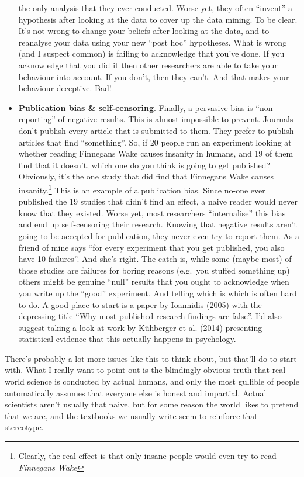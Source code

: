 \documentclass[
  letterpaper,
]{book}
\begin{document}
\begin{itemize}
  the only analysis that they ever conducted. Worse yet, they often
  ``invent'' a hypothesis after looking at the data to cover up the data
  mining. To be clear. It's not wrong to change your beliefs after
  looking at the data, and to reanalyse your data using your new ``post
  hoc'' hypotheses. What is wrong (and I suspect common) is failing to
  acknowledge that you've done. If you acknowledge that you did it then
  other researchers are able to take your behaviour into account. If you
  don't, then they can't. And that makes your behaviour deceptive. Bad!
\item
  \textbf{Publication bias \& self-censoring}. Finally, a pervasive bias
  is ``non-reporting'' of negative results. This is almost impossible to
  prevent. Journals don't publish every article that is submitted to
  them. They prefer to publish articles that find ``something''. So, if
  20 people run an experiment looking at whether reading Finnegans Wake
  causes insanity in humans, and 19 of them find that it doesn't, which
  one do you think is going to get published? Obviously, it's the one
  study that did find that Finnegans Wake causes insanity.\footnote{Clearly,
    the real effect is that only insane people would even try to read
    \emph{Finnegans Wake}} This is an example of a publication bias.
  Since no-one ever published the 19 studies that didn't find an effect,
  a naive reader would never know that they existed. Worse yet, most
  researchers ``internalise'' this bias and end up self-censoring their
  research. Knowing that negative results aren't going to be accepted
  for publication, they never even try to report them. As a friend of
  mine says ``for every experiment that you get published, you also have
  10 failures''. And she's right. The catch is, while some (maybe most)
  of those studies are failures for boring reasons (e.g.~you stuffed
  something up) others might be genuine ``null'' results that you ought
  to acknowledge when you write up the ``good'' experiment. And telling
  which is which is often hard to do. A good place to start is a paper
  by Ioannidis (2005) with the depressing title ``Why most published
  research findings are false''. I'd also suggest taking a look at work
  by Kühberger et al. (2014) presenting statistical evidence that this
  actually happens in psychology.
\end{itemize}

There's probably a lot more issues like this to think about, but that'll
do to start with. What I really want to point out is the blindingly
obvious truth that real world science is conducted by actual humans, and
only the most gullible of people automatically assumes that everyone
else is honest and impartial. Actual scientists aren't usually that
naive, but for some reason the world likes to pretend that we are, and
the textbooks we usually write seem to reinforce that stereotype.
\end{document}
